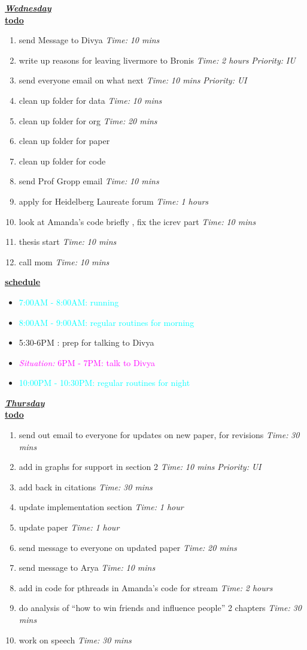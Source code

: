 \documentclass[11pt]{article}
\newcommand{\timeEst}[1]{\textit{Time:} \textit{#1}}
\newcommand{\priority}[1]{\textit{Priority:} \textit{#1}}
\newcommand{\prio}[1]{\textit{Priority:} \textit{#1}}
\newcommand{\regItem}[1]{\item \textcolor{cyan}{#1}}
\newcommand{\situationItem}[1]{\item \textcolor{magenta}{\textit{Situation:} #1}}
\begin{document}
\underline{\textbf{\textit{Wednesday}}}\\
\underline{\textbf{todo}}\\
\begin{enumerate}
\item send Message to Divya \timeEst{10 mins}
\item write up reasons for leaving livermore to Bronis \timeEst{2 hours} \priority{IU}
\item send everyone email on what next \timeEst{10 mins} \prio{UI}
\item clean up folder for data \timeEst{10 mins}
\item clean up folder for org \timeEst{20 mins}
\item clean up folder for paper
\item clean up folder for code
\item send Prof Gropp email \timeEst{10 mins}
\item apply for Heidelberg Laureate forum \timeEst{1 hours}
\item look at Amanda's code briefly , fix the icrev part  \timeEst{10 mins}
\item thesis start \timeEst{10 mins }
\item call mom \timeEst{10 mins }
\end{enumerate}
\underline{\textbf{schedule}}\\
\begin{itemize}
\regItem{7:00AM - 8:00AM: running}
\regItem{8:00AM - 9:00AM: regular routines for morning}
\item 5:30-6PM : prep for talking to Divya
\situationItem {6PM - 7PM: talk to Divya}
\regItem{10:00PM - 10:30PM: regular routines for night}

\end{itemize}

\underline{\textbf{\textit{Thursday}}}\\
\underline{\textbf{todo}}\\
\begin{enumerate}
\item send out email to everyone for updates on new paper, for revisions \timeEst{30 mins}
\item add in graphs for support in section 2 \timeEst{10 mins} \priority{UI}
\item add back in citations \timeEst{30 mins}
\item update implementation section \timeEst{1 hour}
\item update paper \timeEst{1 hour}
\item send message to everyone on updated paper \timeEst{20 mins}
\item send message to Arya \timeEst{10 mins}
\item add in code for pthreads in Amanda's code for stream \timeEst{2 hours}
\item do analysis of ``how to win friends and influence people'' 2 chapters \timeEst{30 mins}
\item work on speech \timeEst{30 mins}
\end{enumerate}
\end{document}
